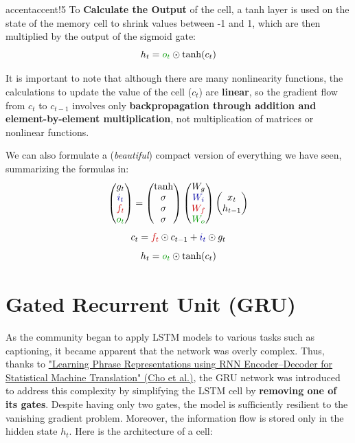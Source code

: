 \begin{remark}{accent}{accent!5}
To \textbf{Calculate the Output} of the cell, a tanh layer is used on the state of the memory cell to shrink values between -1 and 1, which are then multiplied by the output of the sigmoid gate:
$$h_t = \textcolor{mygreen}{o_t} \odot \text{tanh}(c_t) $$
\end{remark}

It is important to note that although there are many nonlinearity functions, the calculations to update the value of the cell ($c_t$) are \textbf{linear}, so the gradient flow from $c_t$ to $c_{t-1}$ involves only \textbf{backpropagation through addition and element-by-element multiplication}, not multiplication of matrices or nonlinear functions.

We can also formulate a (\textit{beautiful}) compact version of everything we have seen, summarizing the formulas in:
$$
\setlength{\arraycolsep}{5pt}
\renewcommand{\arraystretch}{0.95}
\begin{pmatrix}
g_t \\
\textcolor{mybluee}{i_t} \\
\textcolor{myred}{f_t} \\
\textcolor{mygreen}{o_t} 
\end{pmatrix} = 
\begin{pmatrix}
\text{tanh} \\
\sigma \\
\sigma \\
\sigma 
\end{pmatrix}
\begin{pmatrix}
W_g \\
\textcolor{mybluee}{W_i} \\
\textcolor{myred}{W_f} \\
\textcolor{mygreen}{W_o}
\end{pmatrix}
\begin{pmatrix}
x_t \\
h_{t-1}
\end{pmatrix}
$$
$$c_t = \textcolor{myred}{f_t} \odot c_{t-1} + \textcolor{mybluee}{i_t} \odot g_t $$
$$h_t = \textcolor{mygreen}{o_t} \odot \text{tanh}(c_t) $$

\section{Gated Recurrent Unit (GRU)}
As the community began to apply LSTM models to various tasks such as captioning, it became apparent that the network was overly complex. Thus, thanks to \href{https://arxiv.org/pdf/1406.1078}{"Learning Phrase Representations using RNN Encoder–Decoder
for Statistical Machine Translation" (Cho et al.)}, the GRU network was introduced to address this complexity by simplifying the LSTM cell by \textbf{removing one of its gates}. Despite having only two gates, the model is sufficiently resilient to the vanishing gradient problem. Moreover, the information flow is stored only in the hidden state $h_t$. Here is the architecture of a cell:

